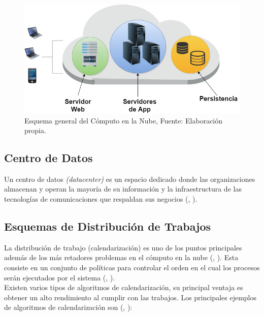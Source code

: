 \newpage

\setcounter{figure}{1}
\renewcommand\thefigure{\arabic{figure}}
\begin{figure}
	\centering
	\includegraphics[scale=0.5]{media/cloud1}
	\caption{Esquema general del C\'omputo en la Nube, Fuente: Elaboraci\'on propia.}
\end{figure}


\subsection*{Centro de Datos}
Un centro de datos \textit{(datacenter)} es un espacio dedicado donde las organizaciones almacenan y operan la mayor\'ia de su informaci\'on y la infraestructura de las tecnolog\'ias de comunicaciones que respaldan sus negocios (\citeauthor{whatisdatacenter}, \citeyear{whatisdatacenter}).

\subsection*{Esquemas de Distribuci\'on de Trabajos}

La distribuci\'on de trabajo (calendarizaci\'on) es uno de los puntos principales adem\'as de los m\'as retadores problemas en el c\'omputo en la nube (\citeauthor{li2014greedy}, \citeyear{li2014greedy}). Esta consiste en un conjunto de pol\'iticas para controlar el orden en el cual los procesos ser\'an ejecutados por el sistema (\citeauthor{agarwal2014efficient}, \citeyear{agarwal2014efficient}).\\

Existen varios tipos de algoritmos de calendarizaci\'on, su principal ventaja es obtener un alto rendimiento al cumplir con las trabajos. Los principales ejemplos de algoritmos de calendarizaci\'on son (\citeauthor{salot2013survey}, \citeyear{salot2013survey}):

